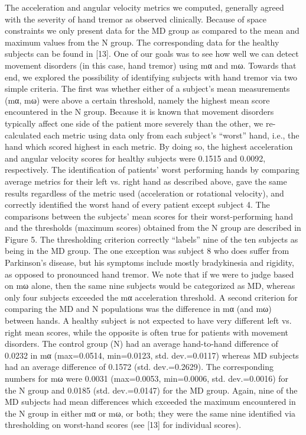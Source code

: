 The acceleration and angular velocity metrics we computed, generally agreed with the severity of hand tremor as observed clinically. Because of space constraints we only present data for the MD group as compared to the mean and maximum values from the N group. The corresponding data for the healthy subjects can be found in [13]. One of our goals was to see how well we can detect movement disorders (in this case, hand tremor) using mα and mω. Towards that end, we explored the possibility of identifying subjects with hand tremor via two simple criteria. The first was whether either of a subject’s mean measurements (mα, mω) were above a certain threshold, namely the highest mean score encountered in the N group. Because it is known that movement disorders typically affect one side of the patient more severely than the other, we re-calculated each metric using data only from each subject’s “worst” hand, i.e., the hand which scored highest in each metric. By doing so, the highest acceleration and angular velocity scores for healthy subjects were 0.1515 and 0.0092, respectively. The identification of patients’ worst performing hands by comparing average metrics for their left vs. right hand as described above, gave the same results regardless of the metric used (acceleration or rotational velocity), and correctly identified the worst hand of every patient except subject 4. The comparisons between the subjects’ mean scores for their worst-performing hand and the thresholds (maximum scores) obtained from the N group are described in Figure 5. The thresholding criterion correctly “labels” nine of the ten subjects as being in the MD group. The one exception was subject 8 who does suffer from Parkinson’s disease, but his symptoms include mostly bradykinesia and rigidity, as opposed to pronounced hand tremor. We note that if we were to judge based on  mω alone, then the same nine subjects would be categorized as MD, whereas only four subjects exceeded the mα acceleration threshold. A second criterion for comparing the MD and N populations was the difference in mα (and mω) between hands. A healthy subject is not expected to have very different left vs. right mean scores, while the opposite is often true for patients with movement disorders. The control group (N) had an average hand-to-hand difference of 0.0232 in mα (max=0.0514, min=0.0123, std. dev.=0.0117) whereas MD subjects had an average difference of 0.1572 (std. dev.=0.2629). The corresponding numbers for mω were 0.0031 (max=0.0053, min=0.0006, std. dev.=0.0016) for the N group and 0.0185 (std. dev.=0.0147) for the MD group. Again, nine of the MD subjects had mean differences which exceeded the maximum encountered in the N group in either mα or mω, or both; they were the same nine identified via thresholding on worst-hand scores (see [13] for individual scores).

